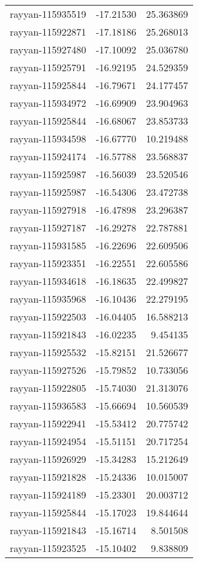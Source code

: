 \documentclass[
]{article}
\begin{document}
\begin{longtable}[]{@{}lrr@{}}
rayyan-115935519 & -17.21530 & 25.363869 \\
rayyan-115922871 & -17.18186 & 25.268013 \\
rayyan-115927480 & -17.10092 & 25.036780 \\
rayyan-115925791 & -16.92195 & 24.529359 \\
rayyan-115925844 & -16.79671 & 24.177457 \\
rayyan-115934972 & -16.69909 & 23.904963 \\
rayyan-115925844 & -16.68067 & 23.853733 \\
rayyan-115934598 & -16.67770 & 10.219488 \\
rayyan-115924174 & -16.57788 & 23.568837 \\
rayyan-115925987 & -16.56039 & 23.520546 \\
rayyan-115925987 & -16.54306 & 23.472738 \\
rayyan-115927918 & -16.47898 & 23.296387 \\
rayyan-115927187 & -16.29278 & 22.787881 \\
rayyan-115931585 & -16.22696 & 22.609506 \\
rayyan-115923351 & -16.22551 & 22.605586 \\
rayyan-115934618 & -16.18635 & 22.499827 \\
rayyan-115935968 & -16.10436 & 22.279195 \\
rayyan-115922503 & -16.04405 & 16.588213 \\
rayyan-115921843 & -16.02235 & 9.454135 \\
rayyan-115925532 & -15.82151 & 21.526677 \\
rayyan-115927526 & -15.79852 & 10.733056 \\
rayyan-115922805 & -15.74030 & 21.313076 \\
rayyan-115936583 & -15.66694 & 10.560539 \\
rayyan-115922941 & -15.53412 & 20.775742 \\
rayyan-115924954 & -15.51151 & 20.717254 \\
rayyan-115926929 & -15.34283 & 15.212649 \\
rayyan-115921828 & -15.24336 & 10.015007 \\
rayyan-115924189 & -15.23301 & 20.003712 \\
rayyan-115925844 & -15.17023 & 19.844644 \\
rayyan-115921843 & -15.16714 & 8.501508 \\
rayyan-115923525 & -15.10402 & 9.838809 \\

\end{longtable}
\end{document}
